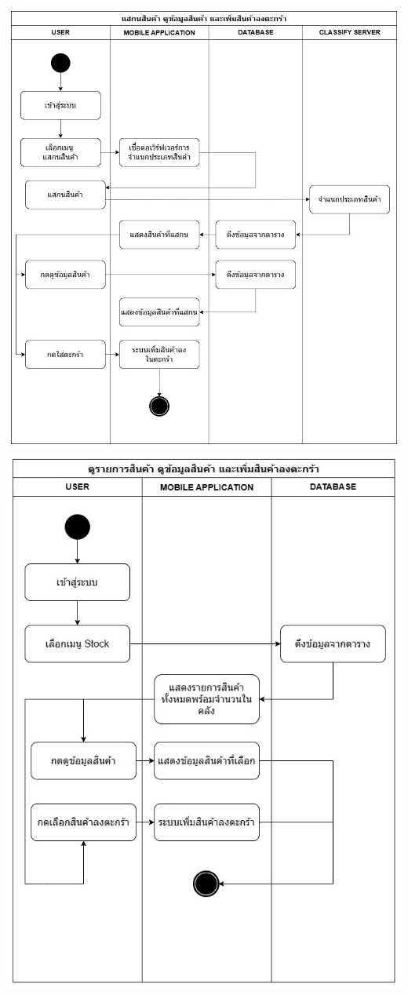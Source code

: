 \begin{center}
    \newpage
    \includegraphics[scale=0.25]{pic/diagram/ad-mobile1.jpg}\\
    \includegraphics[scale=0.25]{pic/diagram/ad-mobile3.jpg}

\end{center}
